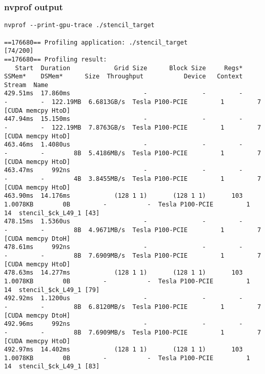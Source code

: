\documentclass{beamer}
\begin{document}
\begin{frame}[fragile]
\frametitle{nvprof output}
\begin{verbatim}
nvprof --print-gpu-trace ./stencil_target

==176680== Profiling application: ./stencil_target                                                                                                                                                                                  [74/200]
==176680== Profiling result:                                                                                                                                             
   Start  Duration            Grid Size      Block Size     Regs*    SSMem*    DSMem*      Size  Throughput           Device   Context    Stream  Name              
429.51ms  17.860ms                    -               -         -         -         -  122.19MB  6.6813GB/s  Tesla P100-PCIE         1         7  [CUDA memcpy HtoD]
447.94ms  15.150ms                    -               -         -         -         -  122.19MB  7.8763GB/s  Tesla P100-PCIE         1         7  [CUDA memcpy HtoD]     
463.46ms  1.4080us                    -               -         -         -         -        8B  5.4186MB/s  Tesla P100-PCIE         1         7  [CUDA memcpy HtoD]
463.47ms     992ns                    -               -         -         -         -        4B  3.8455MB/s  Tesla P100-PCIE         1         7  [CUDA memcpy HtoD]
463.90ms  14.176ms            (128 1 1)       (128 1 1)       103  1.0078KB        0B         -           -  Tesla P100-PCIE         1        14  stencil_$ck_L49_1 [43] 
478.15ms  1.5360us                    -               -         -         -         -        8B  4.9671MB/s  Tesla P100-PCIE         1         7  [CUDA memcpy DtoH]
478.61ms     992ns                    -               -         -         -         -        8B  7.6909MB/s  Tesla P100-PCIE         1         7  [CUDA memcpy HtoD]
478.63ms  14.277ms            (128 1 1)       (128 1 1)       103  1.0078KB        0B         -           -  Tesla P100-PCIE         1        14  stencil_$ck_L49_1 [79] 
492.92ms  1.1200us                    -               -         -         -         -        8B  6.8120MB/s  Tesla P100-PCIE         1         7  [CUDA memcpy DtoH]
492.96ms     992ns                    -               -         -         -         -        8B  7.6909MB/s  Tesla P100-PCIE         1         7  [CUDA memcpy HtoD]
492.97ms  14.402ms            (128 1 1)       (128 1 1)       103  1.0078KB        0B         -           -  Tesla P100-PCIE         1        14  stencil_$ck_L49_1 [83] 

\end{verbatim}
\end{frame}
\end{document}
